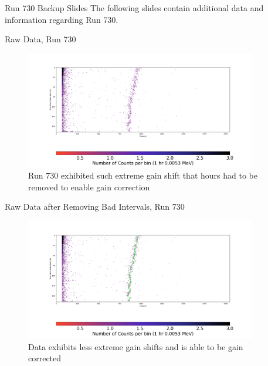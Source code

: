 \documentclass[aspectratio=169]{beamer}
\begin{document}
\begin{frame}{Run 730 Backup Slides}
\label{730_Backup}
    The following slides contain additional data and information regarding Run 730.
\end{frame}

\begin{frame}{Raw Data, Run 730}
    \begin{figure}
        \begin{center}
            \includegraphics[width=0.9\textwidth]
            {assets/730/RD.png}
            \caption{Run 730 exhibited such extreme gain shift that hours had to be removed to enable gain correction}
        \end{center}
    \end{figure}
\end{frame}

\begin{frame}{Raw Data after Removing Bad Intervals, Run 730}
    \begin{figure}
        \begin{center}
            \includegraphics[width=0.9\textwidth]
            {assets/730/RDP.png}
            \caption{Data exhibits less extreme gain shifts and is able to be gain corrected}
        \end{center}
    \end{figure}
\end{frame}
\end{document}
